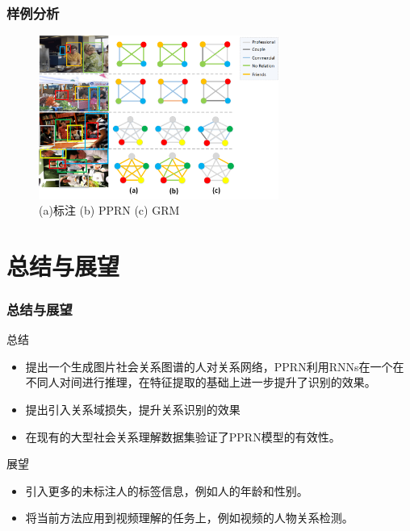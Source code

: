 \documentclass[UTF8]{beamer}
\begin{document}
\begin{frame}
    \frametitle{样例分析}
          \begin{figure}
                \centering
                \includegraphics[width=0.7\textwidth]{images/case_study.png}
                \caption{(a)标注 (b) PPRN  (c) GRM }
                \label{fig:pisc-fine}
         \end{figure}
\end{frame}

\section{总结与展望}

\begin{frame}
    \frametitle{总结与展望}
    \begin{block}{总结}
         \begin{itemize}
         \item 提出一个生成图片社会关系图谱的人对关系网络，PPRN利用RNNs在一个在不同人对间进行推理，在特征提取的基础上进一步提升了识别的效果。
         \item 提出引入关系域损失，提升关系识别的效果
         \item 在现有的大型社会关系理解数据集验证了PPRN模型的有效性。
         \end{itemize}
    \end{block}
    \begin{block}{展望}
        \begin{itemize}
            \item 引入更多的未标注人的标签信息，例如人的年龄和性别。
            \item 将当前方法应用到视频理解的任务上，例如视频的人物关系检测。
        \end{itemize}
    \end{block}
\end{frame}
\end{document}
